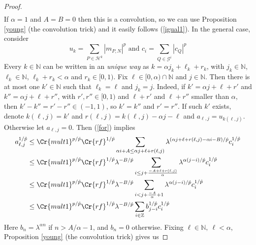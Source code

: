 \documentclass{amsart}
\theoremstyle{definition}
\newcommand{\Crr}[1]{\Cr{#1}}
\begin{document}
\begin{proof}
\begin{align*}
\end{align*}
If $\alpha=1$ and $A=B=0$ then this is a convolution, so we can use Proposition \ref{young} (the convolution trick)  and it easily follows (\ref{igual1}). In the general case, consider
$$u_k=\sum_{P \in \mathcal{H}^k} |m_{P,N}|^p  \text{  and }  c_i=\sum_{Q\in \mathcal{G}^i}  |c_{Q}|^p$$
Every $k\in \mathbb{N}$ can be  written in an {\it unique  way} as $k=\alpha j_k+ \ell_k+r_k$, with $j_k \in \mathbb{N}$, $\ell_k \in \mathbb{N}$, $\ell_k+r_k < \alpha$ and $r_k \in [0,1)$.   Fix  $\ell \in [0,\alpha)\cap\mathbb{N}$ and $j\in \mathbb{N}$. Then there is at most one  $k'\in \mathbb{N}$ such that $\ell_k=\ell$ and $j_k=j$. Indeed, if $k'= \alpha j + \ell+r'$ and $k''= \alpha j + \ell+r''$, with $r',r''\in [0,1)$ and $\ell+r'$ and $\ell+r''$ smaller than $\alpha$, then $k'-k''=r'-r''\in (-1,1)$, so $k'=k''$ and $r'=r''$. If such $k'$ exists, denote $k(\ell,j)=k'$ and $r(\ell,j)= k(\ell,j)-\alpha j -\ell$ and $a_{\ell,j}=u_{k(\ell,j)}$. Otherwise let $a_{\ell,j}=0$. Then (\ref{for}) implies 
\begin{align*}
a_{\ell,j}^{1/\hat{p}}&\leq \Crr{mult1}^{p/\hat{p}}   \Crr{rf}^{1/\hat{p}}  \sum_{\substack{\alpha i + A\leq  \alpha j+ \ell+r(\ell,j)}}  \lambda^{( \alpha j+ \ell+r(\ell,j)-\alpha i -B)/\hat{p}} c_i^{1/\hat{p}}  \\
&\leq \Crr{mult1}^{p/\hat{p}}   \Crr{rf}^{1/\hat{p}} \lambda^{-B/\hat{p}}  \sum_{\substack{ i \leq   j+ \frac{-A+\ell+r(\ell,j)}{\alpha} }  }  \lambda^{ \alpha (j- i)/\hat{p}} c_i^{1/\hat{p}}\\
&\leq  \Crr{mult1}^{p/\hat{p}}   \Crr{rf}^{1/\hat{p}}   \lambda^{-B/\hat{p}}   \sum_{\substack{ i <    j+ \frac{-A}{\alpha} +1}}  \lambda^{ \alpha (j- i)/\hat{p}} c_i^{1/\hat{p}}\\
&\leq \Crr{mult1}^{p/\hat{p}}   \Crr{rf}^{1/\hat{p}}  \lambda^{-B/\hat{p}}   \sum_{i \in \mathbb{Z} }  b_{j-i}^{1/\hat{p}} c_i^{1/\hat{p}}
\end{align*}
Here $b_n= \lambda^{ \alpha n} $ if  $n> A/\alpha - 1$, and $b_n=0$ otherwise. Fixing $\ell \in \mathbb{N}, \ \ell< \alpha$, Proposition \ref{young} (the convolution trick) gives us 

\end{proof}
\end{document}
